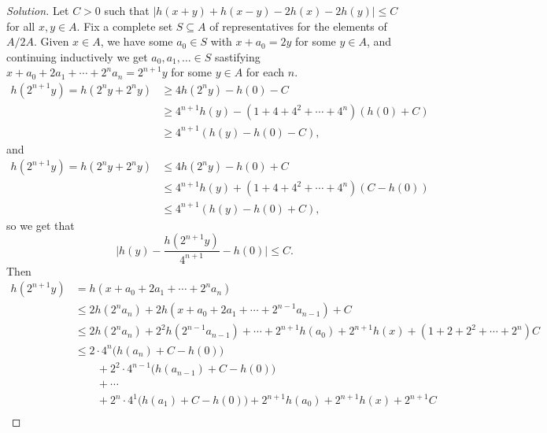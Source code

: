 \documentclass[a4paper]{article}
\theoremstyle{plain}
\theoremstyle{remark}
\theoremstyle{definition}
\begin{document}
\begin{enumerate}
        \begin{proof}[Solution]
            Let $C>0$ such that $|h(x+y)+h(x-y)-2h(x)-2h(y)|\le C$ for all
            $x,y\in A$. Fix a complete set $S\subseteq A$ of representatives for
            the elements of $A/2A$. Given $x\in A$, we have some $a_0\in S$ with
            $x+a_0=2y$ for some $y\in A$, and continuing inductively we get
            $a_0,a_1,\ldots\in S$ sastifying $x+a_0+2a_1+\cdots+2^na_n=2^{n+1}y$
            for some $y\in A$ for each $n$. 
            \begin{align*}
                h(2^{n+1}y) = h(2^ny + 2^ny)
                    &\ge 4h(2^ny) - h(0) - C \\
                    &\ge 4^{n+1}h(y) - (1 + 4 + 4^2 + \cdots + 4^n)(h(0)+C) \\
                    &\ge 4^{n+1}(h(y)-h(0)-C),
            \end{align*}
            and
            \begin{align*}
                h(2^{n+1}y) = h(2^ny+2^ny)
                    &\le 4h(2^ny) - h(0) + C \\
                    &\le 4^{n+1}h(y) + (1+4+4^2+\cdots+4^n)(C-h(0)) \\
                    &\le 4^{n+1}(h(y)-h(0)+C),
            \end{align*}
            so we get that
            \begin{equation*}
                \biggl|h(y)-\frac{h(2^{n+1}y)}{4^{n+1}}-h(0)\biggr| \le C.
            \end{equation*}
            Then
            \begin{align*}
                h(2^{n+1}y)
                    &= h(x+a_0+2a_1+\cdots+2^na_n) \\
                    &\le 2h(2^na_n) + 2h(x+a_0+2a_1+\cdots+2^{n-1}a_{n-1}) + C \\
                    &\le 2h(2^na_n) + 2^2h(2^{n-1}a_{n-1}) + \cdots
                        + 2^{n+1}h(a_0) + 2^{n+1}h(x) + (1+2+2^2+\cdots+2^n)C \\
                    &\le 2\cdot4^n\bigl(h(a_n)+C-h(0)\bigr) \\
                    &\qquad + 2^2\cdot4^{n-1}\bigl(h(a_{n-1})+C-h(0)\bigr) \\
                    &\qquad + \cdots \\
                    &\qquad + 2^n\cdot4^1\bigl(h(a_1)+C-h(0)\bigr)
                        + 2^{n+1}h(a_0) + 2^{n+1}h(x) + 2^{n+1}C \\

\end{align*}
\end{proof}
\end{enumerate}
\end{document}
